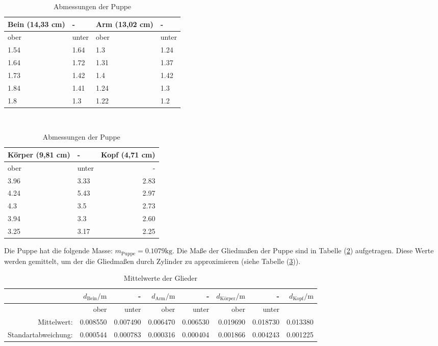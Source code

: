 \begin{table}
  \centering
  \caption{Abmessungen der Puppe}
  \label{tab:Abmessungen}
  \begin{tabular}{llll}
    \toprule
    Bein (14,33 cm) & - & Arm (13,02 cm) & - \\
    \midrule
               ober &      unter &           ober &      unter \\
               1.54 &       1.64 &            1.3 &       1.24 \\
               1.64 &       1.72 &           1.31 &       1.37 \\
               1.73 &       1.42 &            1.4 &       1.42 \\
               1.84 &       1.41 &           1.24 &        1.3 \\
                1.8 &        1.3 &           1.22 &        1.2 \\
    \bottomrule
    \end{tabular}\\

    \begin{tabular}{llr}
      \toprule
      Körper (9,81 cm) & - &  Kopf (4,71 cm) \\
      \midrule
                  ober &      unter &             - \\
                  3.96 &       3.33 &            2.83 \\
                  4.24 &       5.43 &            2.97 \\
                   4.3 &        3.5 &            2.73 \\
                  3.94 &        3.3 &            2.60 \\
                  3.25 &       3.17 &            2.25 \\
      \bottomrule
      \end{tabular}
\end{table}

Die Puppe hat die folgende Masse: $m_{\text{Puppe}} = 0.1079\unit{\kilo\gram}$.
Die Maße der Gliedmaßen der Puppe sind in Tabelle (\ref{tab:Abmessungen}) aufgetragen.
Diese Werte werden gemittelt, um der die Gliedmaßen durch Zylinder zu approximieren (siehe Tabelle (\ref{tab:MittelwertGlieder})).

\begin{table}
  \centering
  \caption{Mittelwerte der Glieder}
  \label{tab:MittelwertGlieder}
  \begin{tabular}{rrrrrrrr}
    \toprule
       & $d_{\text{Bein}} / \unit\meter$ &     - &     $d_{\text{Arm}} / \unit\meter$ &     - &    $d_{\text{Körper}} /  \unit\meter$ &     - &    $d_{\text{Kopf}} /  \unit\meter$\\
    \midrule
     & ober & unter & ober & unter& ober & unter & \\
    Mittelwert: & 0.008550 & 0.007490 & 0.006470 & 0.006530 & 0.019690 & 0.018730 & 0.013380 \\
    Standartabweichung: & 0.000544 & 0.000783 & 0.000316 & 0.000404 & 0.001866 & 0.004243 & 0.001225 \\
    \bottomrule
    \end{tabular}
\end{table}

